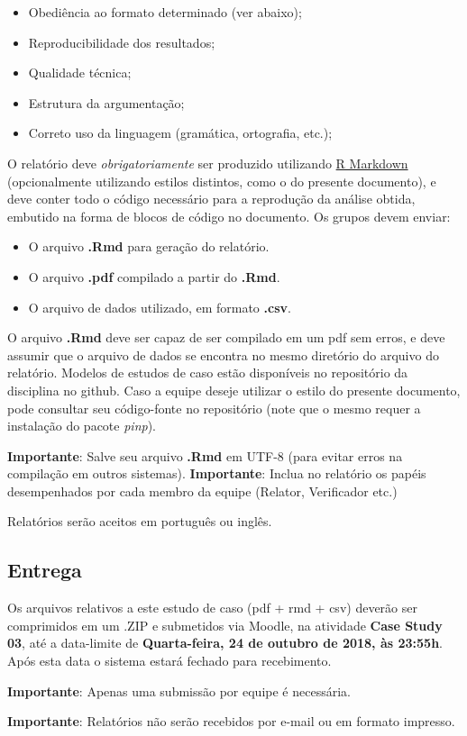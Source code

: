 \documentclass[11pt,twoside,printwatermark=false]{pinp}
\providecommand{\tightlist}{%
  \setlength{\itemsep}{0pt}\setlength{\parskip}{0pt}}
\begin{document}
\begin{itemize}
\tightlist
\item
  Obediência ao formato determinado (ver abaixo);
\item
  Reproducibilidade dos resultados;
\item
  Qualidade técnica;
\item
  Estrutura da argumentação;
\item
  Correto uso da linguagem (gramática, ortografia, etc.);
\end{itemize}

O relatório deve \emph{obrigatoriamente} ser produzido utilizando
\href{http://rmarkdown.rstudio.com}{R Markdown} (opcionalmente
utilizando estilos distintos, como o do presente documento), e deve
conter todo o código necessário para a reprodução da análise obtida,
embutido na forma de blocos de código no documento. Os grupos devem
enviar:

\begin{itemize}
\tightlist
\item
  O arquivo \textbf{.Rmd} para geração do relatório.
\item
  O arquivo \textbf{.pdf} compilado a partir do \textbf{.Rmd}.
\item
  O arquivo de dados utilizado, em formato \textbf{.csv}.
\end{itemize}

O arquivo \textbf{.Rmd} deve ser capaz de ser compilado em um pdf sem
erros, e deve assumir que o arquivo de dados se encontra no mesmo
diretório do arquivo do relatório. Modelos de estudos de caso estão
disponíveis no repositório da disciplina no github. Caso a equipe deseje
utilizar o estilo do presente documento, pode consultar seu código-fonte
no repositório (note que o mesmo requer a instalação do pacote
\emph{pinp}).

\textbf{Importante}: Salve seu arquivo \textbf{.Rmd} em UTF-8 (para
evitar erros na compilação em outros sistemas). \textbf{Importante}:
Inclua no relatório os papéis desempenhados por cada membro da equipe
(Relator, Verificador etc.)

Relatórios serão aceitos em português ou inglês.

\subsection{Entrega}\label{entrega}

Os arquivos relativos a este estudo de caso (pdf + rmd + csv) deverão
ser comprimidos em um .ZIP e submetidos via Moodle, na atividade
\textbf{Case Study 03}, até a data-limite de \textbf{Quarta-feira, 24 de
outubro de 2018, às 23:55h}. Após esta data o sistema estará fechado
para recebimento.

\textbf{Importante}: Apenas uma submissão por equipe é necessária.

\textbf{Importante}: Relatórios não serão recebidos por e-mail ou em
formato impresso.





\end{document}
